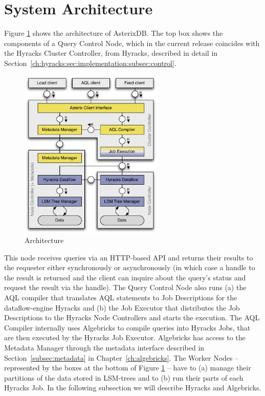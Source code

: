 \section{System Architecture}
\label{ch:asterixdb:sec:sysarch}

Figure \ref{fig:arch} shows the architecture of AsterixDB.
The top box shows the components of a Query Control Node, which in the current release coincides with the Hyracks Cluster Controller, from Hyracks, described in detail in Section~\ref{ch:hyracks:sec:implementation:subsec:control}.

\begin{figure}
\centering
\includegraphics[width=2.7in]{images/asterixdb_arch}
\caption{Architecture\label{fig:arch}}
\end{figure}

This node receives queries via an HTTP-based API and returns their results to the requester either synchronously or asynchronously (in which case a handle to the result is returned and the client can inquire about the query's status and request the result via the handle).
The Query Control Node also runs (a) the AQL compiler that translates AQL statements to Job Descriptions for the dataflow-engine Hyracks and (b) the Job Executor that distributes the Job Descriptions to the Hyracks Node Controllers and starts the execution. The AQL Compiler internally uses Algebricks to compile queries into Hyracks Jobs, that are then executed by the Hyracks Job Executor. Algebricks has access to the Metadata Manager through the metadata interface described in Section~\ref{subsec:metadata} in Chapter~\ref{ch:algebricks}.
The Worker Nodes -- represented by the boxes at the bottom of Figure \ref{fig:arch} -- have to (a) manage their partitions of the data stored in LSM-trees and to (b) run their parts of each Hyracks Job.
In the following subsection we will describe Hyracks and Algebricks. 


